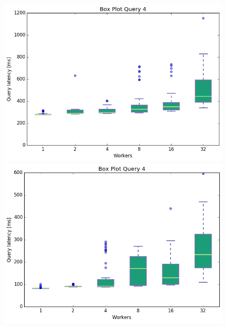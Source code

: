 \documentclass[11pt,singlecolumn]{scrartcl}
\begin{document}
\begin{figure}[!tbp]
  \centering
  \RawFloats
  \begin{minipage}[b]{0.5\textwidth}
    \includegraphics[width=\textwidth]{boxesjl/q4}
  \end{minipage}
  \hfill
  \begin{minipage}[b]{0.5\textwidth}
    \includegraphics[width=\textwidth]{boxesjs/q4}
  \end{minipage}
\end{figure}
\clearpage
\clearpage
\end{document}
